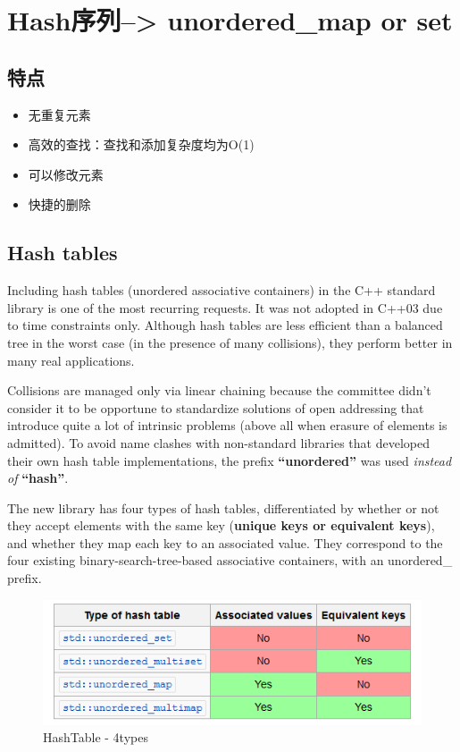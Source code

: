 \documentclass[UTF8,a4paper,12pt]{ctexbook}
\begin{document}
	 	
	\newpage
	\section{Hash序列--> unordered\_map or set}	
		\subsection{特点}
			\begin{itemize}
				\item 无重复元素
				\item 高效的查找：查找和添加复杂度均为O(1)
				\item 可以修改元素
				\item 快捷的删除
			\end{itemize}
		\subsection{Hash tables}
			Including hash tables (unordered associative containers) in the C++ standard library is one of the most recurring requests. It was not adopted in C++03 due to time constraints only. Although hash tables are less efficient than a balanced tree in the worst case (in the presence of many collisions), they perform better in many real applications.
			
			Collisions are managed only via linear chaining because the committee didn't consider it to be opportune to standardize solutions of open addressing that introduce quite a lot of intrinsic problems (above all when erasure of elements is admitted). To avoid name clashes with non-standard libraries that developed their own hash table implementations, the prefix \textbf{“unordered”} was used \textit{instead of} \textbf{“hash”}.
			
			The new library has four types of hash tables, differentiated by whether or not they accept elements with the same key (\textbf{unique keys or equivalent keys}), and whether they map each key to an associated value. They correspond to the four existing binary-search-tree-based associative containers, with an unordered\_ prefix.
			
			\begin{figure}[h]
				\centering
				\includegraphics[width = 15cm]{Hash_Table.png}
				\caption{HashTable - 4types}
			\end{figure}
			
\end{document}
